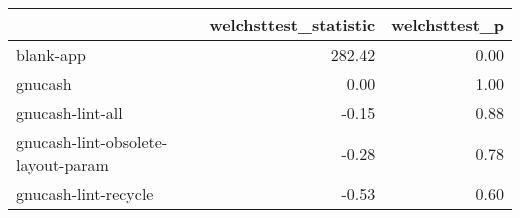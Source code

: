\begin{tabular}{lrr}
\toprule
{} &  welchsttest\_statistic &  welchsttest\_p \\
\midrule
blank-app                          &                 282.42 &           0.00 \\
gnucash                            &                   0.00 &           1.00 \\
gnucash-lint-all                   &                  -0.15 &           0.88 \\
gnucash-lint-obsolete-layout-param &                  -0.28 &           0.78 \\
gnucash-lint-recycle               &                  -0.53 &           0.60 \\
\bottomrule
\end{tabular}
